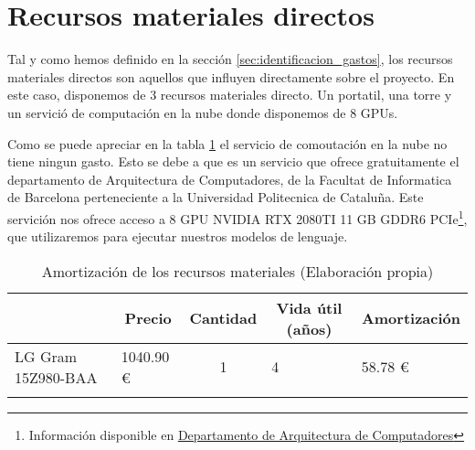 \section{Recursos materiales directos}
\label{sec:recursos_directos}

Tal y como hemos definido en la sección \ref{sec:identificacion_gastos}, los recursos materiales directos son aquellos que influyen directamente sobre el
proyecto. En este caso, disponemos de 3 recursos materiales directo. Un portatil, una torre y un servició de computación en la nube donde disponemos de 8 GPUs.

Como se puede apreciar en la tabla \ref{tab:amortizacion} el servicio de comoutación en la nube no tiene ningun gasto. Esto se debe a que es un servicio que ofrece
gratuitamente el departamento de Arquitectura de Computadores, de la Facultat de Informatica de Barcelona perteneciente a la Universidad Politecnica de Cataluña.
Este servición nos ofrece acceso a 8 GPU NVIDIA RTX 2080TI 11 GB GDDR6 PCIe\footnote{Información disponible en \href{https://www.ac.upc.edu/ca/nosaltres/serveis-tic/blog/nou-node-amb-gpus-al-cluster-sert}{Departamento de Arquitectura de Computadores}},
que utilizaremos para ejecutar nuestros modelos de lenguaje.

\begin{table}[H]
    \centering
    \begin{tabular}{llcll}
    \hline
    \rowcolor[HTML]{8EA9D8} 
    \multicolumn{1}{|c|}{\cellcolor[HTML]{8EA9D8}\textbf{Recursos materiales}} & \multicolumn{1}{c|}{\cellcolor[HTML]{8EA9D8}\textbf{Precio}} & \multicolumn{1}{c|}{\cellcolor[HTML]{8EA9D8}\textbf{Cantidad}} & \multicolumn{1}{c|}{\cellcolor[HTML]{8EA9D8}\textbf{Vida útil (años)}} & \multicolumn{1}{c|}{\cellcolor[HTML]{8EA9D8}\textbf{Amortización}} \\ \hline
    \multicolumn{1}{|l|}{LG Gram 15Z980-BAA}                                   & \multicolumn{1}{l|}{1040.90 €}                               & \multicolumn{1}{c|}{1}                                         & \multicolumn{1}{l|}{4}                                                 & \multicolumn{1}{l|}{58.78 €}                                       \\ \hline
                                                                               &                                                              & \multicolumn{1}{l}{}                                           &                                                                        &                                                                   
    \end{tabular}
    \caption{Amortización de los recursos materiales (Elaboración propia)}
    \label{tab:amortizacion}
\end{table}

